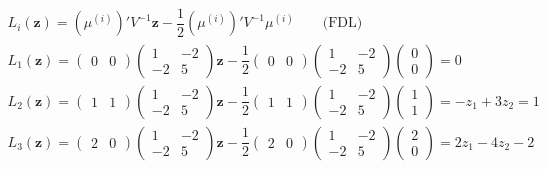 \begin{enumerate}[label=\color{red}\textbf{\arabic*)}, leftmargin=*]
\begin{enumerate}[label=\color{red}\alph*)]
		$\begin{array}{l}
			L_i(\mathbf{z})=\left(\mu^{(i)}\right)'V^{-1}\mathbf{z}-\dfrac{1}{2}\left(\mu^{(i)}\right)'V^{-1}\mu^{(i)}\qquad\text{(FDL)}\\
			L_1(\mathbf{z})=\begin{pmatrix}
				0 & 0
			\end{pmatrix}\begin{pmatrix}
			1 & -2\\
			-2  & 5
			\end{pmatrix}\mathbf{z}-\dfrac{1}{2}\begin{pmatrix}
			0 & 0
			\end{pmatrix}\begin{pmatrix}
			1 & -2\\
			-2 & 5
			\end{pmatrix}\begin{pmatrix}
			0\\
			0
			\end{pmatrix}=0\\
			L_2(\mathbf{z})=\begin{pmatrix}
				1 & 1
			\end{pmatrix}\begin{pmatrix}
			1 & -2\\
			-2  & 5
			\end{pmatrix}\mathbf{z}-\dfrac{1}{2}\begin{pmatrix}
			1 & 1
			\end{pmatrix}\begin{pmatrix}
			1 & -2\\
			-2 & 5
			\end{pmatrix}\begin{pmatrix}
			1\\
			1
			\end{pmatrix}=-z_1+3z_2=1\\
			L_3(\mathbf{z})=\begin{pmatrix}
				2 & 0
			\end{pmatrix}\begin{pmatrix}
			1 & -2\\
			-2  & 5
			\end{pmatrix}\mathbf{z}-\dfrac{1}{2}\begin{pmatrix}
			2 & 0
			\end{pmatrix}\begin{pmatrix}
			1 & -2\\
			-2 & 5
			\end{pmatrix}\begin{pmatrix}
			2\\
			0
			\end{pmatrix}=2z_1-4z_2-2\\
		\end{array}$
		

\end{enumerate}
\end{enumerate}
